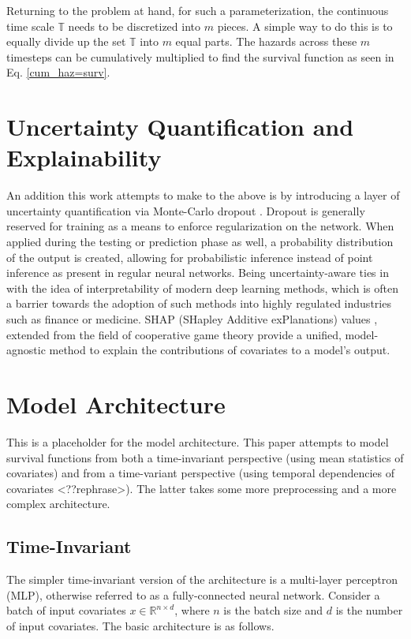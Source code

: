\documentclass[%
 reprint,
 amsmath,amssymb,
 aps,
]{revtex4-2}
\begin{document}
Returning to the problem at hand, for such a parameterization, the continuous time scale $\mathbb{T}$ needs to be discretized into $m$ pieces. A simple way to do this is to equally divide up the set $\mathbb{T}$ into $m$ equal parts. The hazards across these $m$ timesteps can be cumulatively multiplied to find the survival function as seen in Eq. \ref{cum_haz=surv}.

\section{\label{UQ_explain}Uncertainty Quantification and Explainability}
An addition this work attempts to make to the above is by introducing a layer of uncertainty quantification via Monte-Carlo dropout \cite{mcdropout}. Dropout is generally reserved for training as a means to enforce regularization on the network. When applied during the testing or prediction phase as well, a probability distribution of the output is created, allowing for probabilistic inference instead of point inference as present in regular neural networks. Being uncertainty-aware ties in with the idea of interpretability of modern deep learning methods, which is often a barrier towards the adoption of such methods into highly regulated industries such as finance or medicine. SHAP (SHapley Additive exPlanations) values \cite{shap}, extended from the field of cooperative game theory provide a unified, model-agnostic method to explain the contributions of covariates to a model's output.

\section{\label{model_arch}Model Architecture}
This is a placeholder for the model architecture.
This paper attempts to model survival functions from both a time-invariant perspective (using mean statistics of covariates) and from a time-variant perspective (using temporal dependencies of covariates <??rephrase>). The latter takes some more preprocessing and a more complex architecture.

\subsection{\label{time_invar_arch}Time-Invariant}
The simpler time-invariant version of the architecture is a multi-layer perceptron (MLP), otherwise referred to as a fully-connected neural network. Consider a batch of input covariates $x \in \mathbb{R}^{n\times d}$, where $n$ is the batch size and $d$ is the number of input covariates. The basic architecture is as follows.\\
\end{document}

